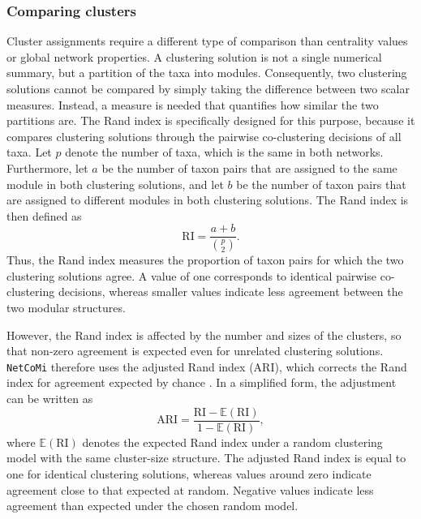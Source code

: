 \subsubsection*{Comparing clusters}

Cluster assignments require a different type of comparison than centrality values or global network properties. A clustering solution is not a single numerical summary, but a partition of the taxa into modules. Consequently, two clustering solutions cannot be compared by simply taking the difference between two scalar measures. Instead, a measure is needed that quantifies how similar the two partitions are. The Rand index is specifically designed for this purpose, because it compares clustering solutions through the pairwise co-clustering decisions of all taxa. Let $p$ denote the number of taxa, which is the same in both networks. Furthermore, let $a$ be the number of taxon pairs that are assigned to the same module in both clustering solutions, and let $b$ be the number of taxon pairs that are assigned to different modules in both clustering solutions. The Rand index is then defined as
\begin{equation}
\label{eq:5net:net_comparison:rand_index}
\mathrm{RI}  = \frac{a+b}{\binom{p}{2}}.
\end{equation}
Thus, the Rand index measures the proportion of taxon pairs for which the two clustering solutions agree. A value of one corresponds to identical pairwise co-clustering decisions, whereas smaller values indicate less agreement between the two modular structures.

However, the Rand index is affected by the number and sizes of the clusters, so that non-zero agreement is expected even for unrelated clustering solutions. \texttt{NetCoMi} therefore uses the adjusted Rand index (ARI), which corrects the Rand index for agreement expected by chance \citep{hubert1985comparing}. In a simplified form, the adjustment can be written as
\begin{equation}
\label{eq:5net:net_comparison:adjusted_rand_index}
\mathrm{ARI} = 
\frac{\mathrm{RI} - \mathbb{E}(\mathrm{RI})}{1 - \mathbb{E}(\mathrm{RI})},
\end{equation}
where $\mathbb{E}(\mathrm{RI})$ denotes the expected Rand index under a random clustering model with the same cluster-size structure. The adjusted Rand index is equal to one for identical clustering solutions, whereas values around zero indicate agreement close to that expected at random. Negative values indicate less agreement than expected under the chosen random model.

